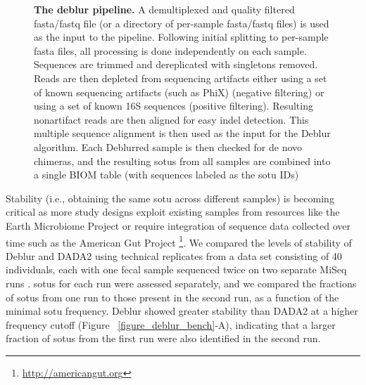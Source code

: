 \begin{figure}[htbp]
\caption[The deblur pipeline]{\textbf{The deblur pipeline.}
A demultiplexed and quality filtered fasta/fastq file (or a directory of per-sample
fasta/fastq files) is used as the input to the pipeline. Following initial
splitting to per-sample fasta files, all processing is done independently on each
sample. Sequences are trimmed and dereplicated with singletons removed. Reads are
then depleted from sequencing artifacts either using a set of known sequencing
artifacts (such as PhiX) (negative filtering) or using a set of known 16S sequences
(positive filtering). Resulting nonartifact reads are then aligned for easy indel
detection. This multiple sequence alignment is then used as the input for the Deblur
algorithm. Each Deblurred sample is then checked for de novo chimeras, and the
resulting s\gls{otu}s from all samples are combined into a single BIOM \cite{McDonald2012BIOM}
table (with sequences labeled as the s\gls{otu} IDs)}
\label{figure_deblur}
\end{figure}

Stability (i.e., obtaining the same s\gls{otu} across different samples) is becoming
critical as more study designs exploit existing samples from resources like the
Earth Microbiome Project \cite{Gilbert2014} or require integration of sequence
data collected over time such as the American Gut Project \footnote{\url{http://americangut.org}}.
We compared the levels of stability of Deblur and DADA2 using technical replicates
from a data set consisting of 40 individuals, each with one fecal sample sequenced
twice on two separate MiSeq runs \cite{Hildebrand2014}. s\gls{otu}s for each run were
assessed separately, and we compared the fractions of s\gls{otu}s from one run to
those present in the second run, as a function of the minimal s\gls{otu} frequency.
Deblur showed greater stability than DADA2 at a higher frequency cutoff (Figure ~\ref{figure_deblur_bench}-A),
indicating that a larger fraction of s\gls{otu}s from the first run were also identified in the second run.

